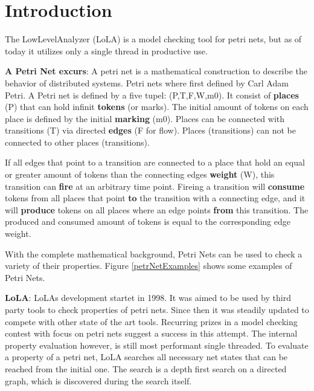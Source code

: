 \chapter{Introduction}
\label{introduction}

The LowLevelAnalyzer (LoLA) is a model checking tool for petri nets, but as of today it utilizes only a single thread in productive use.

\textbf{A Petri Net excurs}:
A petri net is a mathematical construction to describe the behavior of distributed systems. Petri nets where first defined by Carl Adam Petri\cite{petri1962kommunikation}. A Petri net is defined by a five tupel: (P,T,F,W,m0). It consist of \textbf{places} (P) that can hold infinit \textbf{tokens} (or marks). The initial amount of tokens on each place is defined by the initial \textbf{marking} (m0). Places can be connected with transitions (T) via directed \textbf{edges} (F for flow). Places (transitions) can not be connected to other places (transitions). 

If all edges that point to a transition are connected to a place that hold an equal or greater amount of tokens than the connecting edges \textbf{weight} (W), this transition can \textbf{fire} at an arbitrary time point. Fireing a transition will \textbf{consume} tokens from all places that point \textbf{to} the transition with a connecting edge, and it will \textbf{produce} tokens on all places where an edge points \textbf{from} this transition. The produced and consumed amount of tokens is equal to the corresponding edge weight.

With the complete mathematical background, Petri Nets can be used to check a variety of their properties. Figure \ref{petrNetExamples} shows some examples of Petri Nets.



\textbf{LoLA}:
LoLAs development startet in 1998. It was aimed to be used by third party tools to check properties of petri nets\cite{schmidt2000lola}. Since then it was steadily updated to compete with other state of the art tools. Recurring prizes in a model checking contest with focus on petri nets suggest a success in this attempt\cite{MCC2017}.
The internal property evaluation however, is still most performant single threaded. To evaluate a property of a petri net, LoLA searches all necessary net states that can be reached from the initial one. The search is a depth first search on a directed graph, which is discovered during the search itself.

